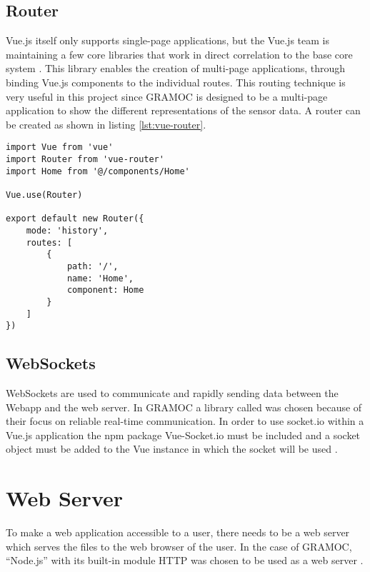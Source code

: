 \subsection{Router}
Vue.js itself only supports single-page applications, but the Vue.js team is maintaining a few core libraries that work in direct correlation to the base core system \cite{vuerouter}. This library enables the creation of multi-page applications, through binding Vue.js components to the individual routes. This routing technique is very useful in this project since GRAMOC is designed to be a multi-page application to show the different representations of the sensor data. A router can be created as shown in listing \ref{lst:vue-router}.

\begin{minipage}{\linewidth}
\begin{lstlisting}[caption={Creating a Vue instance}, label=lst:vue-router, captionpos=b, style=htmlcssjs]
import Vue from 'vue'
import Router from 'vue-router'
import Home from '@/components/Home'

Vue.use(Router)

export default new Router({
    mode: 'history',
    routes: [
        {
            path: '/',
            name: 'Home',
            component: Home
        }
    ]
})
\end{lstlisting}
\end{minipage}

\subsection{WebSockets}
WebSockets are used to communicate and rapidly sending data between the Webapp and the web server. In GRAMOC a library called  was chosen because of their focus on reliable real-time communication. In order to use socket.io within a Vue.js application the npm package Vue-Socket.io must be included and a socket object must be added to the Vue instance in which the socket will be used \cite{vuesocketio}.

\section{Web Server}
\label{sec:webserver}
To make a web application accessible to a user, there needs to be a web server which serves the files to the web browser of the user. In the case of GRAMOC, ``Node.js'' with its built-in module HTTP was chosen to be used as a web server \cite{Node}.

